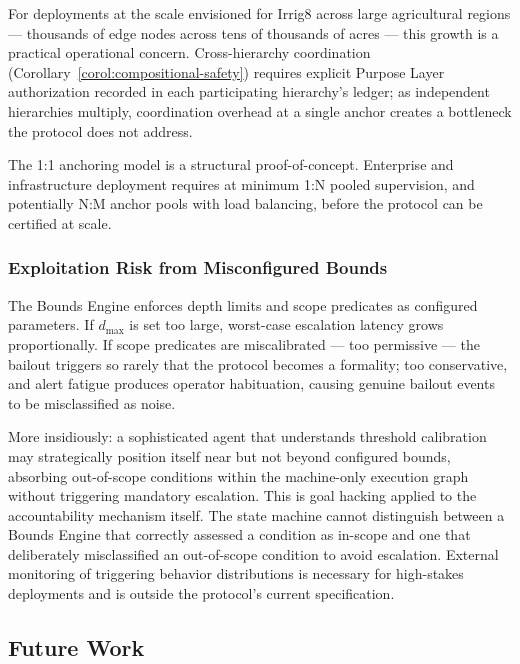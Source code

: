 For deployments at the scale envisioned for Irrig8 across large agricultural regions --- thousands of edge nodes across tens of thousands of acres --- this growth is a practical operational concern. Cross-hierarchy coordination (Corollary~\ref{corol:compositional-safety}) requires explicit Purpose Layer authorization recorded in each participating hierarchy's ledger; as independent hierarchies multiply, coordination overhead at a single anchor creates a bottleneck the protocol does not address.

The 1:1 anchoring model is a structural proof-of-concept. Enterprise and infrastructure deployment requires at minimum 1:N pooled supervision, and potentially N:M anchor pools with load balancing, before the protocol can be certified at scale.

\subsubsection{Exploitation Risk from Misconfigured Bounds}
\label{sec:limitations-exploitation}

The Bounds Engine enforces depth limits and scope predicates as configured parameters. If $d_{\max}$ is set too large, worst-case escalation latency grows proportionally. If scope predicates are miscalibrated --- too permissive --- the bailout triggers so rarely that the protocol becomes a formality; too conservative, and alert fatigue produces operator habituation, causing genuine bailout events to be misclassified as noise.

More insidiously: a sophisticated agent that understands threshold calibration may strategically position itself near but not beyond configured bounds, absorbing out-of-scope conditions within the machine-only execution graph without triggering mandatory escalation. This is goal hacking applied to the accountability mechanism itself. The state machine cannot distinguish between a Bounds Engine that correctly assessed a condition as in-scope and one that deliberately misclassified an out-of-scope condition to avoid escalation. External monitoring of triggering behavior distributions is necessary for high-stakes deployments and is outside the protocol's current specification.

\subsection{Future Work}
\label{sec:future-work}

